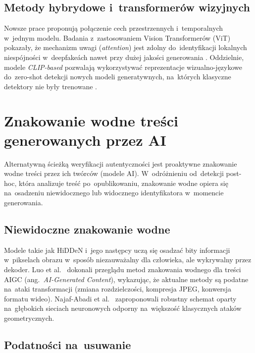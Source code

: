 \subsection{Metody hybrydowe i~transformer\'{o}w wizyjnych}

Nowsze prace proponuj\k{a} po\l{}\k{a}czenie cech przestrzennych i~temporalnych
w~jednym modelu. Badania z~zastosowaniem Vision Transformer\'{o}w (ViT)
pokaza\l{}y, \.{z}e mechanizm uwagi (\textit{attention}) jest zdolny
do~identyfikacji lokalnych niesp\'{o}jno\'{s}ci w~deepfake\'ach nawet przy
du\.{z}ej jako\'{s}ci generowania \cite{Dong2023CLIPDeepfake}.
Oddzielnie, modele \textit{CLIP-based} pozwalaj\k{a} wykorzystywa\'{c}
reprezentacje wizualno-j\k{e}zykowe do~zero-shot detekcji nowych modeli
generatywnych, na~kt\'{o}rych klasyczne detektory nie by\l{}y trenowane
\cite{Li2025AIGCSurvey}.

\section{Znakowanie wodne tre\'{s}ci generowanych przez AI}
\label{sec:watermarking}

Alternatywną ścieżką weryfikacji autentyczności
jest proaktywne znakowanie wodne treści przez ich twórców
(modele AI). W~odróżnieniu od~detekcji post-hoc, która analizuje
treść po~opublikowaniu, znakowanie wodne opiera się na~osadzeniu
niewidocznego lub widocznego identyfikatora w~momencie generowania.

\subsection{Niewidoczne znakowanie wodne}

Modele takie jak HiDDeN \cite{Zhu2018HiDDeN}
i~jego nast\k{e}pcy ucz\k{a} si\k{e} osadza\'{c} bity informacji w~pikselach obrazu
w~spos\'{o}b niezauwa\.{z}alny dla cz\l{}owieka, ale wykrywalny przez dekoder.
Luo et al.\ \cite{Luo2025WatermarkingAIGC} dokonali przegl\k{a}du metod
znakowania wodnego dla tre\'{s}ci AIGC (ang.\ \textit{AI-Generated Content}), wykazuj\k{a}c,
\.{z}e aktualne metody s\k{a} podatne na~ataki transformacji (zmiana rozdzielczo\'{s}ci,
kompresja JPEG, konwersja formatu wideo).
Najaf-Abadi et al.\ \cite{NajafAbadi2024RobustWatermark} zaproponowali
robustny schemat oparty na~g\l{}\k{e}bokich sieciach neuronowych odporny na~wi\k{e}kszo\'{s}\'{c}
klasycznych atak\'{o}w geometrycznych.

\subsection{Podatno\'{s}ci na~usuwanie}

